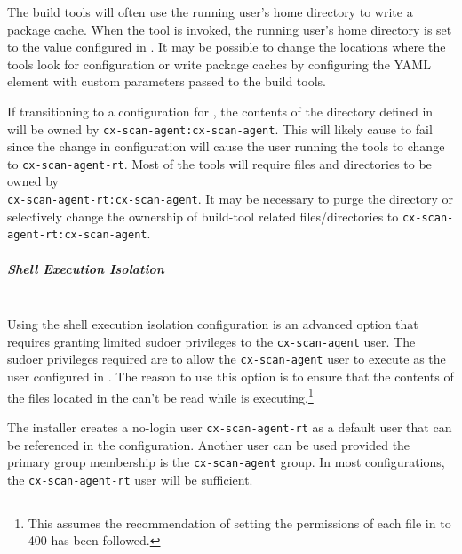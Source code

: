 The build tools will often use the running user's home directory to write a package cache.  When the tool is invoked,
the running user's home directory is set to the value configured in .
It may be possible to change the locations where the tools look for configuration or write package caches by configuring the
 YAML element with
{custom parameters} passed to the build tools.

If transitioning to a configuration for , the contents of the directory
defined in  will be owned by \texttt{cx-scan-agent:cx-scan-agent}.  This will likely
cause \scaresolver to fail since the change in configuration will cause the user running the tools to change to
\texttt{cx-scan-agent-rt}.  Most of the tools will require files and directories to be owned by\\\texttt{cx-scan-agent-rt:cx-scan-agent}.
It may be necessary to purge the  directory or selectively change
the ownership of build-tool related files/directories to \texttt{cx-scan-agent-rt:cx-scan-agent}.


\subparagraph{Shell Execution Isolation}\label{par:shell-agent-isolation}
\noindent\\Using the shell execution isolation configuration is an advanced option that requires granting limited sudoer privileges
to the \texttt{cx-scan-agent} user.  The sudoer privileges required are to allow the \texttt{cx-scan-agent} user to execute \scaresolver
as the user configured in .  The reason to use this option is to ensure that
the contents of the files located in the  can't be read while \scaresolver
is executing.\footnote{This assumes the recommendation of setting the permissions of each file in 
 to 400 has been followed.}

The installer creates a no-login user \texttt{cx-scan-agent-rt} as a default user that can be referenced in the 
configuration.  Another user can be used provided the primary group membership is the \texttt{cx-scan-agent} group.  In most configurations, 
the \texttt{cx-scan-agent-rt} user will be sufficient.

